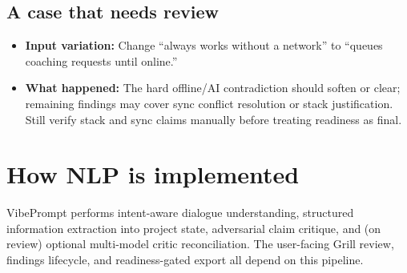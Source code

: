 \documentclass[11pt,a4paper]{article}
\newcommand{\appname}{VibePrompt}
\begin{document}
\subsection{A case that needs review}
\begin{itemize}
  \item \textbf{Input variation:} Change ``always works without a network'' to
        ``queues coaching requests until online.''
  \item \textbf{What happened:} The hard offline/AI contradiction should soften or clear;
        remaining findings may cover sync conflict resolution or stack justification.
        Still verify stack and sync claims manually before treating readiness as final.
\end{itemize}

\newpage

\section{How NLP is implemented}
\label{sec:nlp}

\appname{} performs intent-aware dialogue understanding, structured information
extraction into project state, adversarial claim critique, and (on review)
optional multi-model critic reconciliation. The user-facing Grill review,
findings lifecycle, and readiness-gated export all depend on this pipeline.
\end{document}
